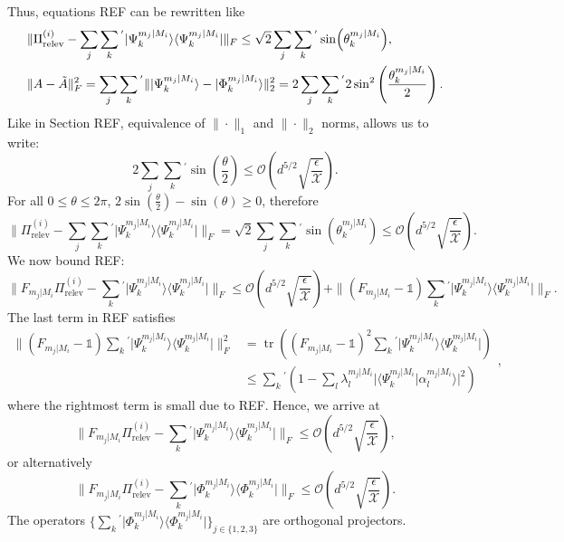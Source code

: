 Thus, equations REF can be rewritten like
\begin{align}
& \|\Pi_{\text{relev}}^{(i)}-\sum_j\sum_k{}^{'}\vert \Psi_k^{m_j\vert M_i}\rangle \langle \Psi_k^{m_j\vert M_i}\vert \|_F\leq\sqrt{2}\sum_j\sum_k{}^{'}\sin(\theta_k^{m_j\vert M_i}), \\
& \|A-\Tilde{A}\|_F^2=\sum_j\sum_k{}^{'}\|\vert \Psi_k^{m_j\vert M_i} \rangle - \vert \Phi_k^{m_j\vert M_i}\rangle\|_2^2=2\sum_j\sum_k{}^{'}2\sin^2\left(\frac{\theta_k^{m_j\vert M_i}}{2}\right).
\end{align}
Like in Section REF, equivalence of $\|\cdot\|_1$ and $\|\cdot\|_2$ norms, allows us to write:
\begin{equation}
2\sum_j\sum_k{}^{'}\sin\left(\frac{\theta}{2}\right)\leq \mathcal{O}\left(d^{5/2}\sqrt{\frac{\epsilon}{\mathcal{X}}}\right).
\end{equation}
For all $0\leq \theta \leq 2\pi$, $2\sin(\frac{\theta}{2})-\sin(\theta)\geq 0$, therefore
\begin{equation}
\|\Pi_{\text{relev}}^{(i)}-\sum_j\sum_k{}^{'}\vert \Psi_k^{m_j\vert M_i}\rangle \langle \Psi_k^{m_j\vert M_i}\vert \|_F = \sqrt{2}\sum_j\sum_k{}^{'}\sin(\theta_k^{m_j\vert M_i})\leq\mathcal{O}\left(d^{5/2}\sqrt{\frac{\epsilon}{\mathcal{X}}}\right).
\end{equation}
We now bound REF:
\begin{equation}
\|F_{m_j\vert M_i}\Pi_{\text{relev}}^{(i)}-\sum_{k}{}^{'}\vert \Psi_k^{m_j\vert M_i}\rangle \langle \Psi_k^{m_j\vert M_i}\vert \|_F \leq \mathcal{O}\left(d^{5/2}\sqrt{\frac{\epsilon}{\mathcal{X}}}\right)+\|(F_{m_j\vert M_i}-\mathbb{1})\sum_k{}^{'}\vert \Psi_k^{m_j\vert M_i} \rangle \langle \Psi_k^{m_j\vert M_i} \vert \|_F.
\end{equation}
The last term in REF satisfies
\begin{equation}
\begin{split}
\|(F_{m_j\vert M_i}-\mathbb{1})\sum_k{}^{'}\vert \Psi_k^{m_j\vert M_i} \rangle \langle \Psi_k^{m_j\vert M_i} \vert \|_F^2 & =\operatorname{tr}((F_{m_j\vert M_i}-\mathbb{1})^2\sum_k{}^{'}\vert \Psi_k^{m_j\vert M_i} \rangle \langle \Psi_k^{m_j\vert M_i} \vert) \\
& \leq \sum_k{}^{'}(1-\sum_l \lambda_l^{m_j\vert M_i}\vert \langle \Psi_k^{m_j\vert M_i}\vert \alpha_l^{m_j\vert M_i}\rangle \vert ^2)
\end{split},
\end{equation}
where the rightmost term is small due to REF. Hence, we arrive at
\begin{equation}
\|F_{m_j\vert M_i}\Pi_{\text{relev}}^{(i)}-\sum_{k}{}^{'}\vert \Psi_k^{m_j\vert M_i}\rangle \langle \Psi_k^{m_j\vert M_i}\vert \|_F \leq \mathcal{O}\left(d^{5/2}\sqrt{\frac{\epsilon}{\mathcal{X}}}\right),
\end{equation}
or alternatively
\begin{equation}
\|F_{m_j\vert M_i}\Pi_{\text{relev}}^{(i)}-\sum_{k}{}^{'}\vert \Phi_k^{m_j\vert M_i}\rangle \langle \Phi_k^{m_j\vert M_i}\vert \|_F \leq \mathcal{O}\left(d^{5/2}\sqrt{\frac{\epsilon}{\mathcal{X}}}\right).
\end{equation}
The operators $\{\sum_{k}{}^{'}\vert \Phi_k^{m_j\vert M_i}\rangle \langle \Phi_k^{m_j\vert M_i}\vert\}_{j\in\{1,2,3\}}$ are orthogonal projectors.
